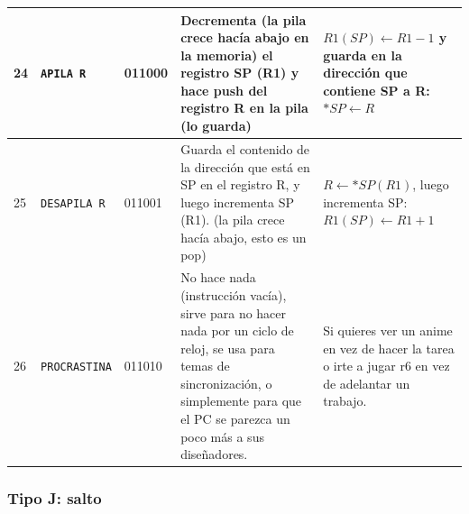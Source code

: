 \documentclass{article}
\begin{document}
\begin{longtable}{|p{}|p{}|p{}|p{}|p{}|}
  \hline
  24              & \texttt{APILA R}     & 011000                          & Decrementa (la pila crece hacía abajo en la memoria) el registro SP (R1) y hace push del registro R en la pila (lo guarda)                                                                    & $R1 (SP) \leftarrow R1 - 1$ y guarda en la dirección que contiene SP a R:  $*SP \leftarrow R$                       \\
  \hline
  25              & \texttt{DESAPILA R}  & 011001                          & Guarda el contenido de la dirección que está en SP en el registro R, y luego incrementa SP (R1). (la pila crece hacía abajo, esto es un pop)                                                  & $R \leftarrow *SP(R1)$, luego incrementa SP: $R1(SP) \leftarrow  R1 + 1 $                                           \\
  \hline
  26              & \texttt{PROCRASTINA} & 011010                          & No hace nada (instrucción vacía), sirve para no hacer nada por un ciclo de reloj, se usa para temas de sincronización, o simplemente para que el PC se parezca un poco más a sus diseñadores. & Si quieres ver un anime en vez de hacer la tarea o irte a jugar r6 en vez de adelantar un trabajo.                  \\
  \hline
\end{longtable}

\subsubsection{Tipo J: \textbf{salto}}
\end{document}
